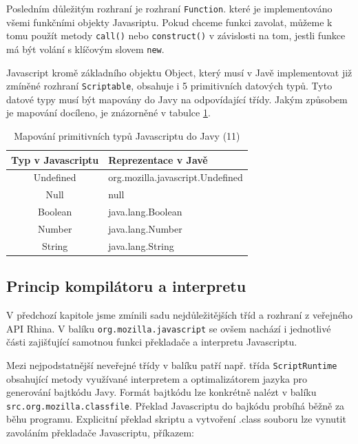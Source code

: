 Posledním důležitým rozhraní je rozhraní \texttt{Function}. které je implementováno všemi funkčními objekty Javasriptu. Pokud chceme funkci zavolat, můžeme k tomu použít metody \texttt{call()} nebo \texttt{construct()} v závislosti na tom, jestli funkce má být volání s klíčovým slovem \texttt{new}.

Javascript kromě základního objektu Object, který musí v Javě implementovat již zmíněné rozhraní \texttt{Scriptable}, obsahuje i 5 primitivních datových typů. Tyto datové typy musí být mapovány do Javy na odpovídající třídy. Jakým způsobem je mapování docíleno, je znázorněné v tabulce \ref{Table.JavaScriptToJavaMapping}. 

\begin{table}[H]
  \begin{center} 
    \begin{tabular}{| c | l |} \hline
    \textbf{Typ v Javascriptu} & \textbf{Reprezentace v Javě} \\ \hline
    Undefined & org.mozilla.javascript.Undefined \\ \hline
    Null & null \\ \hline
    Boolean & java.lang.Boolean  \\ \hline
    Number & java.lang.Number \\ \hline
    String & java.lang.String \\ \hline
    \end{tabular}
    \caption{Mapování primitivních typů Javascriptu do Javy (11)}
    \label{Table.JavaScriptToJavaMapping}
  \end{center}
\end{table}

\subsection{Princip kompilátoru a interpretu}
\label{Chapter.JavaScriptInJavaAnalysis.Rhino.CompilerTechniques}

V předchozí kapitole jsme zmínili sadu nejdůležitějších tříd a rozhraní z veřejného API Rhina. V balíku \texttt{org.mozilla.javascript} se ovšem nachází i jednotlivé části zajišťující samotnou funkci překladače a interpretu Javascriptu.

Mezi nejpodstatnější neveřejné třídy v balíku patří např. třída \texttt{ScriptRuntime} obsahující metody využívané interpretem a optimalizátorem jazyka pro generování bajtkódu Javy. Formát bajtkódu lze konkrétně nalézt v balíku \texttt{src.org.mozilla.classfile}. Překlad Javascriptu do bajkódu probíhá běžně za běhu programu. Explicitní překlad skriptu a vytvoření .class souboru lze vynutit zavoláním překladače Javascriptu, příkazem:

